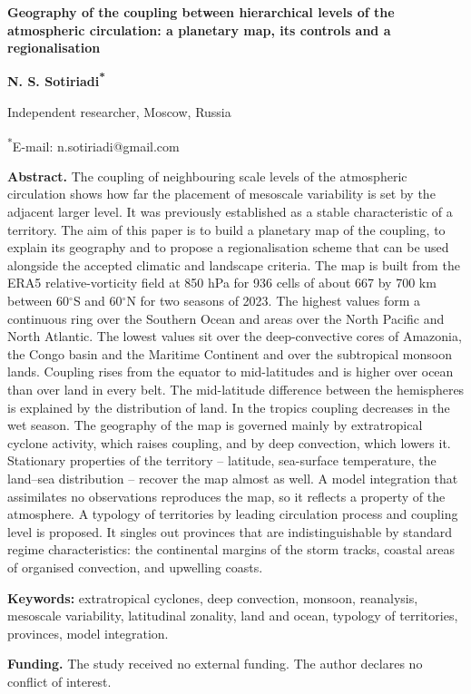 \documentclass[12pt,a4paper]{article}
\begin{document}
\clearpage
\begin{center}
{\large\bfseries Geography of the coupling between hierarchical levels of the atmospheric circulation: a planetary map, its controls and a regionalisation}

\medskip
{\bfseries N. S. Sotiriadi\textsuperscript{*}}

Independent researcher, Moscow, Russia

\textsuperscript{*}E-mail: n.sotiriadi@gmail.com
\end{center}

\begin{singlespace}
\noindent\textbf{Abstract.} The coupling of neighbouring scale levels of the atmospheric circulation shows how far the placement of mesoscale variability is set by the adjacent larger level. It was previously established as a stable characteristic of a territory. The aim of this paper is to build a planetary map of the coupling, to explain its geography and to propose a regionalisation scheme that can be used alongside the accepted climatic and landscape criteria. The map is built from the ERA5 relative-vorticity field at 850 hPa for 936 cells of about 667 by 700 km between 60$^\circ$S and 60$^\circ$N for two seasons of 2023. The highest values form a continuous ring over the Southern Ocean and areas over the North Pacific and North Atlantic. The lowest values sit over the deep-convective cores of Amazonia, the Congo basin and the Maritime Continent and over the subtropical monsoon lands. Coupling rises from the equator to mid-latitudes and is higher over ocean than over land in every belt. The mid-latitude difference between the hemispheres is explained by the distribution of land. In the tropics coupling decreases in the wet season. The geography of the map is governed mainly by extratropical cyclone activity, which raises coupling, and by deep convection, which lowers it. Stationary properties of the territory -- latitude, sea-surface temperature, the land--sea distribution -- recover the map almost as well. A model integration that assimilates no observations reproduces the map, so it reflects a property of the atmosphere. A typology of territories by leading circulation process and coupling level is proposed. It singles out provinces that are indistinguishable by standard regime characteristics: the continental margins of the storm tracks, coastal areas of organised convection, and upwelling coasts.

\smallskip
\noindent\textbf{Keywords:} extratropical cyclones, deep convection, monsoon, reanalysis, mesoscale variability, latitudinal zonality, land and ocean, typology of territories, provinces, model integration.

\smallskip
\noindent\textbf{Funding.} The study received no external funding. The author declares no conflict of interest.
\end{singlespace}
\end{document}
